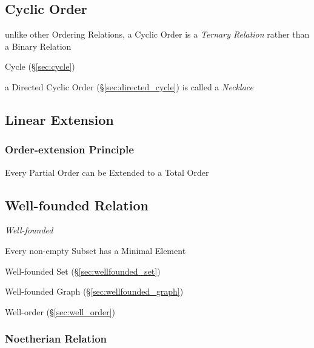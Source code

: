 \subsection{Cyclic Order}\label{sec:cyclic_order}

unlike other Ordering Relations, a Cyclic Order is a \emph{Ternary Relation}
rather than a Binary Relation

Cycle (\S\ref{sec:cycle})

a Directed Cyclic Order (\S\ref{sec:directed_cycle}) is called a \emph{Necklace}



\subsection{Linear Extension}\label{sec:linear_extension}

\subsubsection{Order-extension Principle}
\label{sec:order_extension_principle}

Every Partial Order can be Extended to a Total Order



\subsection{Well-founded Relation}\label{sec:well_founded}

\emph{Well-founded}

Every non-empty Subset has a Minimal Element

Well-founded Set (\S\ref{sec:wellfounded_set})

Well-founded Graph (\S\ref{sec:wellfounded_graph})

Well-order (\S\ref{sec:well_order})



\subsubsection{Noetherian Relation}\label{sec:noetherian_relation}

